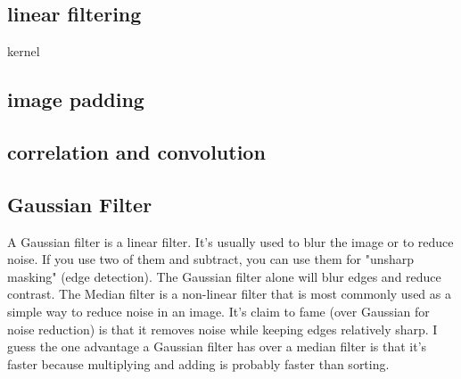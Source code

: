 \documentclass[a4paper]{article}
\begin{document}
\subsection{linear filtering}
\label{sec:org6b048eb}
kernel
\subsection{image padding}
\label{sec:orged3b9c5}
\subsection{correlation and convolution}
\label{sec:orgd0b09bb}
\subsection{Gaussian Filter}
\label{sec:org5a6b1d2}
    A Gaussian filter is a linear filter. It's usually used to blur the image or to reduce noise. If you use two of them and subtract,
    you can use them for "unsharp masking" (edge detection).
    The Gaussian filter alone will blur edges and reduce contrast.
The Median filter is a non-linear filter that is most commonly used as a simple way to reduce noise in an image.
It's claim to fame (over Gaussian for noise reduction)
is that it removes noise while keeping edges relatively sharp.
I guess the one advantage a Gaussian filter has over a median filter is that it's faster because multiplying and adding is probably faster than sorting.
\end{document}
